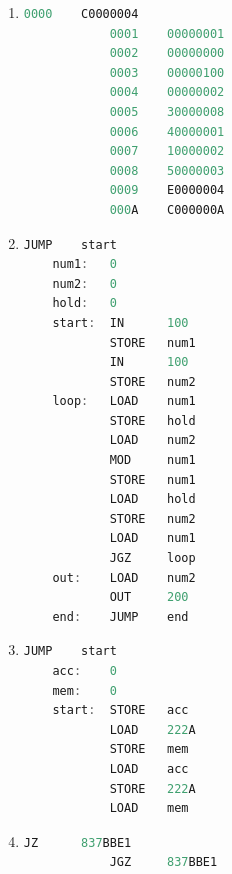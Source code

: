 \documentclass[12pt,letterpaper]{article}
\begin{document}
\begin{enumerate}
        \item %
        	\begin{lstlisting}[language=C, caption={0 - 255}]
		    0000	C0000004
    		0001	00000001 
    		0002	00000000 
    		0003	00000100 
    	    0004	00000002 
    		0005	30000008 
            0006	40000001 
            0007	10000002 
            0008 	50000003 
            0009	E0000004 
    		000A	C000000A 
            \end{lstlisting}
            
        \item %
        	\begin{lstlisting}[language=C, caption={GCD}]
            JUMP	start
    num1:	0
    num2:	0
    hold:	0
    start:  IN		100
    		STORE	num1
            IN		100
            STORE	num2
	loop:	LOAD	num1
    		STORE	hold
    		LOAD	num2
    		MOD		num1
            STORE	num1
            LOAD	hold
            STORE	num2
            LOAD	num1
            JGZ		loop
    out:	LOAD	num2
    		OUT		200
    end:	JUMP	end
            \end{lstlisting}
        
        \pagebreak
        \item %
        	\begin{lstlisting}[language=C, caption={Swap Accumulator and 0x222A}]
            JUMP	start
    acc:	0
    mem:	0
    start:  STORE	acc
    		LOAD	222A
            STORE	mem
            LOAD	acc
            STORE	222A
            LOAD	mem
            \end{lstlisting}
            
        \item %
        	\begin{lstlisting}[language=C, caption={Jump}]
            JZ		837BBE1
            JGZ		837BBE1
            \end{lstlisting}
        
    \end{enumerate}
    
\end{document}
